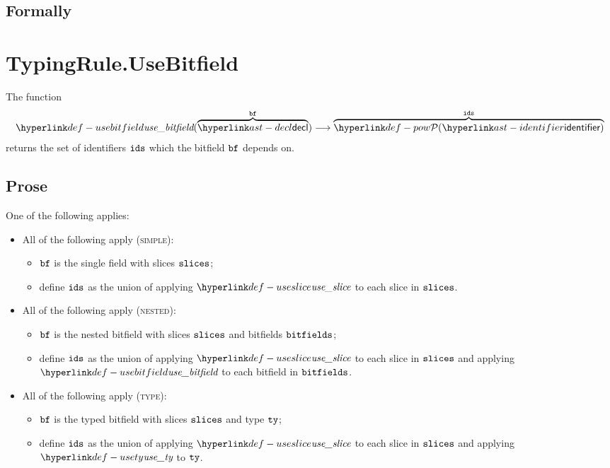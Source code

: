 \subsection{Formally}

\section{TypingRule.UseBitfield \label{sec:TypingRule.UseBitfield}}
\hypertarget{def-usebitfield}{}
The function
\[
\usebitfield(\overname{\decl}{\vbf}) \aslto \overname{\pow{\identifier}}{\ids}
\]
returns the set of identifiers $\texttt{ids}$ which the bitfield $\texttt{bf}$ depends on.

\subsection{Prose}
One of the following applies:
\begin{itemize}
  \item All of the following apply (\textsc{simple}):
  \begin{itemize}
    \item $\texttt{bf}$ is the single field with slices $\texttt{slices}$;
    \item define $\texttt{ids}$ as the union of applying $\useslice$ to each slice in $\texttt{slices}$.
  \end{itemize}

  \item All of the following apply (\textsc{nested}):
  \begin{itemize}
    \item $\texttt{bf}$ is the nested bitfield with slices $\texttt{slices}$ and bitfields $\texttt{bitfields}$;
    \item define $\texttt{ids}$ as the union of applying $\useslice$ to each slice in $\texttt{slices}$ and applying
          $\usebitfield$ to each bitfield in $\texttt{bitfields}$.
  \end{itemize}

  \item All of the following apply (\textsc{type}):
  \begin{itemize}
    \item $\texttt{bf}$ is the typed bitfield with slices $\texttt{slices}$ and type $\texttt{ty}$;
    \item define $\texttt{ids}$ as the union of applying $\useslice$ to each slice in $\texttt{slices}$ and applying
          $\usety$ to $\texttt{ty}$.
  \end{itemize}
\end{itemize}

